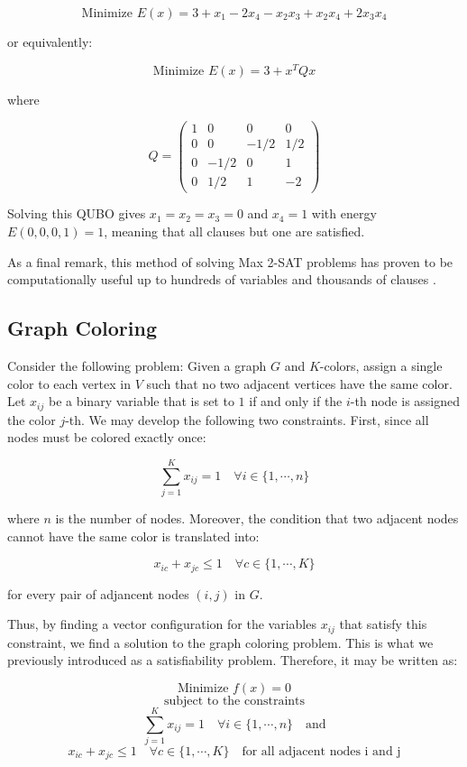 $$ \text{Minimize } E(x) = 3 + x_1 - 2 x_4 - x_2x_3 + x_2x_4 + 2 x_3x_4 $$

or equivalently:

$$ \text{Minimize } E(x) = 3 + x^T Q x $$

where

$$
Q = 
\left(
\begin{array}{cccc}
	1 & 0 & 0 & 0 \\
	0 & 0 & -1/2 & 1/2 \\
	0 & -1/2 & 0 & 1 \\
	0 & 1/2 & 1 & -2 
\end{array}
\right)
$$

Solving this QUBO gives $x_1 = x_2 = x_3 = 0$ and $x_4 = 1$ with energy $E(0, 0, 0, 1) = 1$, meaning that all clauses but one are satisfied.

As a final remark, this method of solving Max 2-SAT problems has proven to be computationally useful up to hundreds of variables and thousands of clauses \cite{Kochenberger2005}.


\subsection{Graph Coloring}


Consider the following problem: Given a graph $G$ and $K$-colors, assign a single color to each vertex in $V$ such that no two adjacent vertices have the same color. Let $x_{ij}$ be a binary variable that is set to $1$ if and only if the $i$-th node is assigned the color $j$-th. We may develop the following two constraints. First, since all nodes must be colored exactly once:

$$ \sum_{j=1}^K x_{ij} = 1 \quad \forall i \in \{1, \cdots, n\} $$

where $n$ is the number of nodes. Moreover, the condition that two adjacent nodes cannot have the same color is translated into:

$$ x_{ic} + x_{jc} \leq 1 \quad \forall c \in \{1, \cdots, K\} $$

for every pair of adjancent nodes $(i,j)$ in $G$.

Thus, by finding a vector configuration for the variables $x_{ij}$ that satisfy this constraint, we find a solution to the graph coloring problem. This is what we previously introduced as a satisfiability problem. Therefore, it may be written as:

$$ \text{Minimize } f(x) = 0 $$
$$ \text{subject to the constraints} $$
$$ \sum_{j=1}^K x_{ij} = 1 \quad \forall i \in \{1, \cdots, n\} \quad \text{and}$$
$$ x_{ic} + x_{jc} \leq 1 \quad \forall c \in \{1, \cdots, K\} \quad \text{for all adjacent nodes i and j}$$


